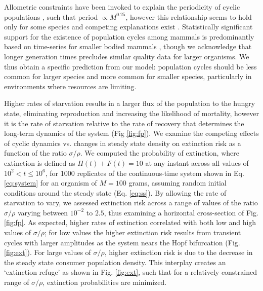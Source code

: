 \documentclass{pnastwo}
\begin{document}
\begin{article}
Allometric constraints have been invoked to explain the periodicity of cyclic populations \cite{CalderIII:1983jd,Peterson:1984hj,Krukonis:1991fk}, such that period $\propto M^{0.25}$, however this relationship seems to hold only for some species \cite{Hendriks:2012fc} and competing explanations exist \cite{Kendall:1999iy,Hogstedt:2005cr}.
Statistically significant support for the existence of population cycles among mammals is predominantly based on time-series for smaller bodied mammals \cite{Kendall:1998hl}, though we acknowledge that longer generation times precludes similar quality data for larger organisms.
We thus obtain a specific prediction from our model: population cycles should be less common for larger species and more common for smaller species, particularly in environments where resources are limiting. %




Higher rates of starvation results in a larger flux of the population to the hungry state, eliminating reproduction and increasing the likelihood of mortality, however it is the rate of starvation relative to the rate of recovery that determines the long-term dynamics of the system (Fig \ref{fig:fp}).
We examine the competing effects of cyclic dynamics vs. changes in steady state density on extinction risk as a function of the ratio $\sigma/\rho$.
We computed the probability of extinction, where extinction is defined as $H(t)+F(t)=10$ at any instant across all values of $10^2<t\leq 10^6$, for 1000 replicates of the continuous-time system shown in Eq. \ref{eq:system} for an organism of $M=100$ grams, assuming random initial conditions around the steady state (Eq. \ref{eq:ss}). %
By allowing the rate of starvation to vary, we assessed extinction risk across a range of values of the ratio $\sigma/\rho$ varying between $10^{-2}$ to $2.5$, thus examining a horizontal cross-section of Fig. \ref{fig:fp}.
As expected, higher rates of extinction correlated with both low and high values of $\sigma/\rho$; for low values the higher extinction risk results from transient cycles with larger amplitudes as the system nears the Hopf bifurcation (Fig. \ref{fig:ext}).
For large values of $\sigma/\rho$, higher extinction risk is due to the decrease in the steady state consumer population density.
This interplay creates an `extinction refuge' as shown in Fig. \ref{fig:ext}, such that for a relatively constrained range of $\sigma/\rho$, extinction probabilities are minimized.


\end{article}
\end{document}
